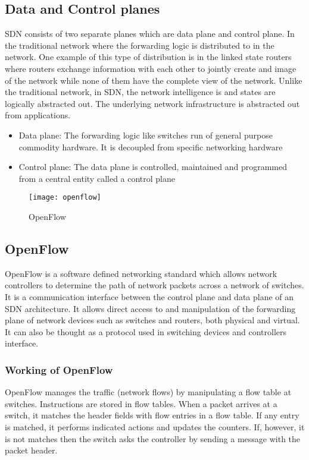 \subsection{Data and Control planes}
SDN consists of two separate planes which are data plane and control plane. In the traditional network where the forwarding logic is distributed to in the network. One example of this type of distribution is in the linked state routers where routers exchange information with each other to jointly create and image of the network while none of them have the complete view of the network. Unlike the traditional network, in SDN, the network intelligence is and states are logically abstracted out. The underlying network infrastructure is abstracted out from applications.
\begin{itemize}
    \item Data plane: The forwarding logic like switches run of general purpose commodity hardware. It is decoupled from specific networking hardware
    \item Control plane: The data plane is controlled, maintained and programmed from a central entity called a control plane 
\end{itemize}

\begin{figure}[h]
\begin{center}	
\texttt{[image: openflow]} 
\caption{OpenFlow}
\label{fig:openflow}
\end{center}
\end{figure}

\subsection{OpenFlow}
OpenFlow is a software defined networking standard which allows network controllers to determine the path of network packets across a network of switches. It is a communication interface between the control plane and data plane of an SDN architecture. It allows direct access to and manipulation of the forwarding plane of network devices such as switches and routers, both physical and virtual. It can also be thought as a protocol used in switching devices and controllers interface.

\subsubsection{Working of OpenFlow}
OpenFlow manages the traffic (network flows) by manipulating a flow table at switches. Instructions are stored in flow tables. When a packet arrives at a switch, it matches the header fields with flow entries in a flow table. If any entry is matched, it performs indicated actions and updates the counters. If, however, it is not matches then the switch asks the controller by sending a message with the packet header.

